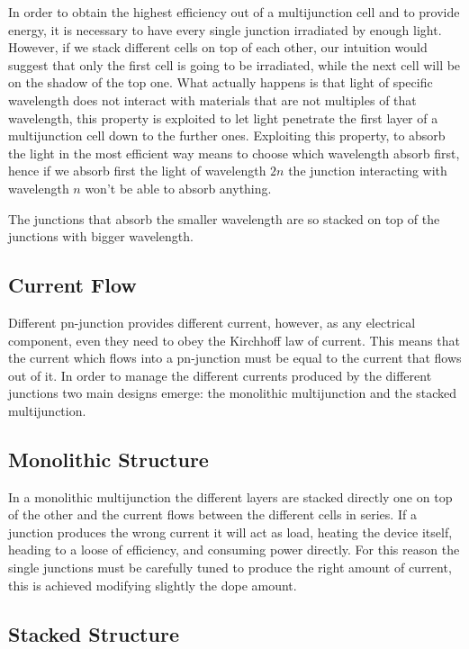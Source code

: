 \documentclass[11pt]{article} %
\begin{document}
In order to obtain the highest efficiency out of a multijunction cell and to provide energy, it is necessary to have every single junction irradiated by enough light. 
However, if we stack different cells on top of each other, our intuition would suggest that only the first cell is going to be irradiated, while the next cell will be on the shadow of the top one.  
What actually happens is that light of specific wavelength does not interact with materials that are not multiples of that wavelength, this property is exploited to let light penetrate the first layer of a multijunction cell down to the further ones.  Exploiting this property, to absorb the light in the most efficient way means to choose which wavelength absorb first, hence if we absorb first the light of wavelength $2n$ the junction interacting with wavelength $n$ won't be able to absorb anything. 

The junctions that absorb the smaller wavelength are so stacked on top of the junctions with bigger wavelength.  

\subsection{Current Flow}

Different pn-junction provides different current, however, as any electrical component, even they need to obey the Kirchhoff law of current. This means that the current which flows into a pn-junction must be equal to the current that flows out of it.  In order to manage the different currents produced by the different junctions two main designs emerge: the monolithic multijunction and the stacked multijunction. 

\subsection{Monolithic Structure}

In a monolithic multijunction the different layers are stacked directly one on top of the other and the current flows between the different cells in series. If a junction produces the wrong current it will act as load, heating the device itself, heading to a loose of efficiency, and consuming power directly.  For this reason the single junctions must be carefully tuned to produce the right amount of current, this is achieved modifying slightly the dope amount.  

\subsection{Stacked Structure}
\end{document}
